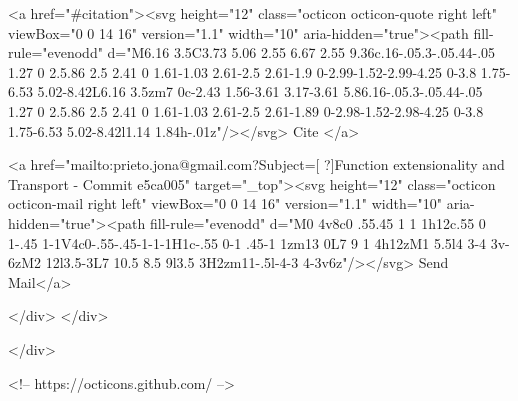       <a  href="#citation"><svg height="12" class="octicon octicon-quote right left" viewBox="0 0 14 16" version="1.1" width="10" aria-hidden="true"><path fill-rule="evenodd" d="M6.16 3.5C3.73 5.06 2.55 6.67 2.55 9.36c.16-.05.3-.05.44-.05 1.27 0 2.5.86 2.5 2.41 0 1.61-1.03 2.61-2.5 2.61-1.9 0-2.99-1.52-2.99-4.25 0-3.8 1.75-6.53 5.02-8.42L6.16 3.5zm7 0c-2.43 1.56-3.61 3.17-3.61 5.86.16-.05.3-.05.44-.05 1.27 0 2.5.86 2.5 2.41 0 1.61-1.03 2.61-2.5 2.61-1.89 0-2.98-1.52-2.98-4.25 0-3.8 1.75-6.53 5.02-8.42l1.14 1.84h-.01z"/></svg> Cite
      </a>

      <a href="mailto:prieto.jona@gmail.com?Subject=[ ?]Function extensionality and Transport - Commit e5ca005" target="_top"><svg height="12" class="octicon octicon-mail right left" viewBox="0 0 14 16" version="1.1" width="10" aria-hidden="true"><path fill-rule="evenodd" d="M0 4v8c0 .55.45 1 1 1h12c.55 0 1-.45 1-1V4c0-.55-.45-1-1-1H1c-.55 0-1 .45-1 1zm13 0L7 9 1 4h12zM1 5.5l4 3-4 3v-6zM2 12l3.5-3L7 10.5 8.5 9l3.5 3H2zm11-.5l-4-3 4-3v6z"/></svg> Send Mail</a>

    </div>
  </div>

</div>

<!-- https://octicons.github.com/ -->





